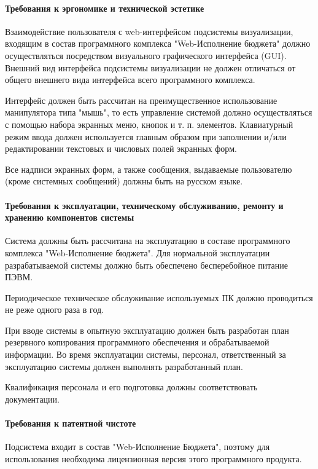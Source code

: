 \documentclass[a4paper]{extarticle}
\numberwithin{equation}{section}
\begin{document}
\paragraph{Требования к эргономике и технической эстетике}
Взаимодействие пользователя с web-интерфейсом подсистемы визуализации, входящим в состав программного комплекса "Web-Исполнение бюджета" должно осуществляться посредством визуального графического интерфейса (GUI). Внешний вид интерфейса подсистемы визуализации не должен отличаться от общего внешнего вида интерфейса всего программного комплекса.\par
Интерфейс должен быть рассчитан на преимущественное использование манипулятора типа "мышь", то есть управление системой должно осуществляться с помощью набора экранных меню, кнопок и т. п. элементов. Клавиатурный режим ввода должен используется главным образом при заполнении и/или редактировании текстовых и числовых полей экранных форм.\par
Все надписи экранных форм, а также сообщения, выдаваемые пользователю (кроме системных сообщений) должны быть на русском языке.

\paragraph{Требования к эксплуатации, техническому обслуживанию, ремонту и хранению компонентов системы}
Система должны быть рассчитана на эксплуатацию в составе программного комплекса "Web-Исполнение бюджета". Для нормальной эксплуатации разрабатываемой системы должно быть обеспечено бесперебойное питание ПЭВМ.\par
Периодическое техническое обслуживание используемых ПК должно проводиться не реже одного раза в год.\par
При вводе системы в опытную эксплуатацию должен быть разработан план резервного копирования программного обеспечения и обрабатываемой информации. Во время эксплуатации системы, персонал, ответственный за эксплуатацию системы должен выполнять разработанный план.\par
Квалификация персонала и его подготовка должны соответствовать документации.

\paragraph{Требования к патентной чистоте}
Подсистема входит в состав "Web-Исполнение Бюджета", поэтому для использования необходима лицензионная версия этого программного продукта.
\end{document}
